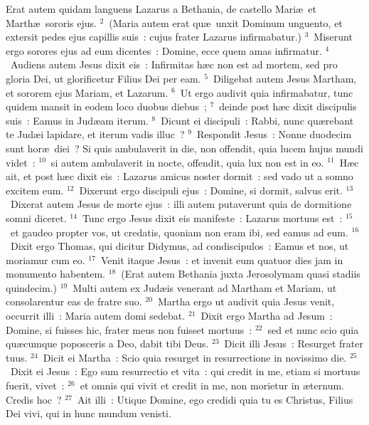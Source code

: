 \lettrine[lines=10,image=true,loversize=0.05,lraise=-0.03]{E}{}rat autem quidam languens Lazarus a Bethania, de castello Mari\ae\ et Marth\ae\ sororis ejus.
${}^{2}$~(Maria autem erat qu\ae\ unxit Dominum unguento, et extersit pedes ejus capillis suis~: cujus frater Lazarus infirmabatur.)
${}^{3}$~Miserunt ergo sorores ejus ad eum dicentes~: Domine, ecce quem amas infirmatur.
${}^{4}$~Audiens autem Jesus dixit eis~: Infirmitas h\ae c non est ad mortem, sed pro gloria Dei, ut glorificetur Filius Dei per eam.
${}^{5}$~Diligebat autem Jesus Martham, et sororem ejus Mariam, et Lazarum.
${}^{6}$~Ut ergo audivit quia infirmabatur, tunc quidem mansit in eodem loco duobus diebus~;
${}^{7}$~deinde post h\ae c dixit discipulis suis~: Eamus in Jud\ae am iterum.
${}^{8}$~Dicunt ei discipuli~: Rabbi, nunc qu\ae rebant te Jud\ae i lapidare, et iterum vadis illuc~?
${}^{9}$~Respondit Jesus~: Nonne duodecim sunt hor\ae\ diei~? Si quis ambulaverit in die, non offendit, quia lucem hujus mundi videt~:
${}^{10}$~si autem ambulaverit in nocte, offendit, quia lux non est in eo.
${}^{11}$~H\ae c ait, et post h\ae c dixit eis~: Lazarus amicus noster dormit~: sed vado ut a somno excitem eum.
${}^{12}$~Dixerunt ergo discipuli ejus~: Domine, si dormit, salvus erit.
${}^{13}$~Dixerat autem Jesus de morte ejus~: illi autem putaverunt quia de dormitione somni diceret.
${}^{14}$~Tunc ergo Jesus dixit eis manifeste~: Lazarus mortuus est~:
${}^{15}$~et gaudeo propter vos, ut credatis, quoniam non eram ibi, sed eamus ad eum.
${}^{16}$~Dixit ergo Thomas, qui dicitur Didymus, ad condiscipulos~: Eamus et nos, ut moriamur cum eo.
${}^{17}$~Venit itaque Jesus~: et invenit eum quatuor dies jam in monumento habentem.
${}^{18}$~(Erat autem Bethania juxta Jerosolymam quasi stadiis quindecim.)
${}^{19}$~Multi autem ex Jud\ae is venerant ad Martham et Mariam, ut consolarentur eas de fratre suo.
${}^{20}$~Martha ergo ut audivit quia Jesus venit, occurrit illi~: Maria autem domi sedebat.
${}^{21}$~Dixit ergo Martha ad Jesum~: Domine, si fuisses hic, frater meus non fuisset mortuus~:
${}^{22}$~sed et nunc scio quia qu\ae cumque poposceris a Deo, dabit tibi Deus.
${}^{23}$~Dicit illi Jesus~: Resurget frater tuus.
${}^{24}$~Dicit ei Martha~: Scio quia resurget in resurrectione in novissimo die.
${}^{25}$~Dixit ei Jesus~: Ego sum resurrectio et vita~: qui credit in me, etiam si mortuus fuerit, vivet~:
${}^{26}$~et omnis qui vivit et credit in me, non morietur in \ae ternum. Credis hoc~?
${}^{27}$~Ait illi~: Utique Domine, ego credidi quia tu es Christus, Filius Dei vivi, qui in hunc mundum venisti.
